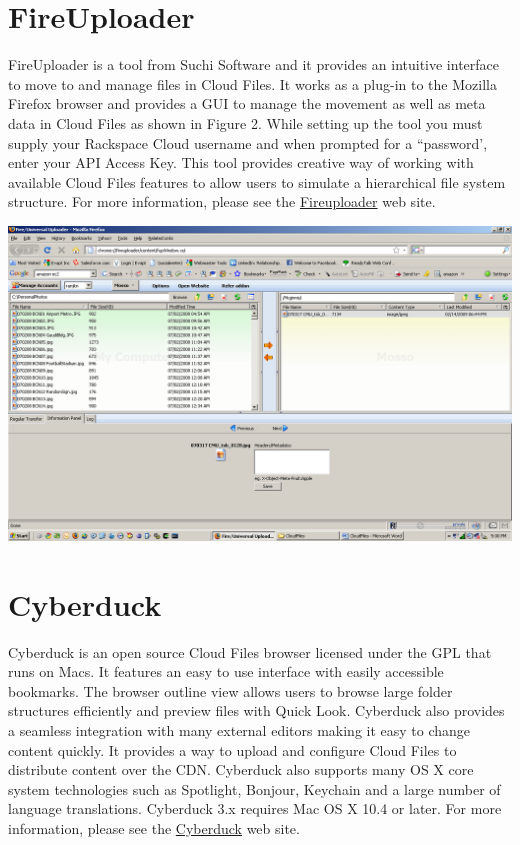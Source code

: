 \documentclass[letterpaper,10pt,english]{manual}
\begin{document}
\section{FireUploader}

FireUploader is a tool from Suchi Software and it provides an intuitive
interface to move to and manage files in Cloud Files. It works as a plug-in
to the Mozilla Firefox browser and provides a GUI to manage the movement as
well as meta data in Cloud Files as shown in Figure 2.  While setting up
the tool you must supply your Rackspace Cloud username and when prompted for
a “password’, enter your API Access Key. This tool provides creative way of
working with available Cloud Files features to allow users to simulate a
hierarchical file system structure.  For more information, please see the
\href{http://www.fireuploader.com}{Fireuploader} web site.

{\hfill\includegraphics{fireuploader.png}\hfill}


\section{Cyberduck}

Cyberduck is an open source Cloud Files browser licensed under the GPL that
runs on Macs. It features an easy to use interface with easily accessible
bookmarks. The browser outline view allows users to browse large folder
structures efficiently and preview files with Quick Look.  Cyberduck also
provides a seamless integration with many external editors making it easy
to change content quickly.  It provides a way to upload and configure Cloud
Files to distribute content over the CDN.  Cyberduck also supports many OS
X core system technologies such as Spotlight, Bonjour, Keychain and a large
number of language translations. Cyberduck 3.x requires Mac OS X 10.4 or
later.  For more information, please see the \href{http://www.cyberduck.ch}{Cyberduck} web site.
\end{document}

